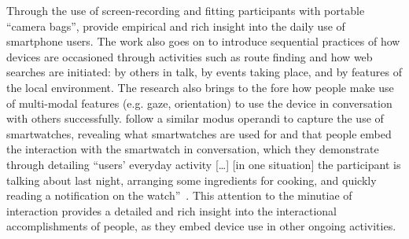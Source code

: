 Through the use of screen-recording and fitting participants with portable ``camera bags'', \citet{Brown2013} provide  empirical and rich insight into the daily use of smartphone users.
The work also goes on to introduce sequential practices of how devices are occasioned through activities such as route finding and how web searches are initiated: by others in talk, by events taking place, and by features of the local environment.
The research also brings to the fore how people make use of multi-modal features (e.g. gaze, orientation) to use the device in conversation with others successfully.
\citet{Pizza2016} follow a similar modus operandi to capture the use of smartwatches, revealing what smartwatches are used for and that people embed the interaction with the smartwatch in conversation, which they demonstrate through detailing ``users’ everyday activity [\ldots] [in one situation] the participant is talking about last night, arranging some ingredients for cooking, and quickly reading a notification on the watch''~\citep[p. 5464]{Pizza2016}.
This attention to the minutiae of interaction provides a detailed and rich insight into the interactional accomplishments of people, as they embed device use in other ongoing activities.

